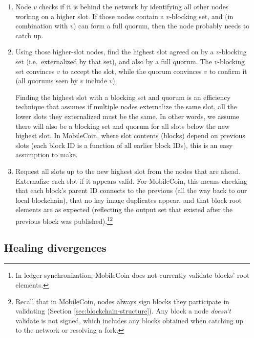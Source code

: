 \begin{enumerate}
    \item Node $v$ checks if it is behind the network by identifying all other nodes working on a higher slot. If those nodes contain a $v$-blocking set, and (in combination with $v$) can form a full quorum, then the node probably needs to catch up.

    \item Using those higher-slot nodes, find the highest slot agreed on by a $v$-blocking set (i.e.\ externalized by that set), and also by a full quorum. The $v$-blocking set convinces $v$ to accept the slot, while the quorum convinces $v$ to confirm it (all quorums seen by $v$ include $v$).

    Finding the highest slot with a blocking set and quorum is an efficiency technique that assumes if multiple nodes externalize the same slot, all the lower slots they externalized must be the same. In other words, we assume there will also be a blocking set and quorum for all slots below the new highest slot. In MobileCoin, where slot contents (blocks) depend on previous slots (each block ID is a function of all earlier block IDs), this is an easy assumption to make.

    \item Request all slots up to the new highest slot from the nodes that are ahead. Externalize each slot if it appears valid. For MobileCoin, this means checking that each block's parent ID connects to the previous (all the way back to our local blockchain), that no key image duplicates appear, and that block root elements are as expected (reflecting the output set that existed after the previous block was published).\footnote{In ledger synchronization, MobileCoin does not currently validate blocks' root elements.}\footnote{Recall that in MobileCoin, nodes always sign blocks they participate in validating (Section \ref{sec:blockchain-structure}). Any block a node {\em doesn't} validate is not signed, which includes any blocks obtained when catching up to the network or resolving a fork.}
\end{enumerate}


\subsection{Healing divergences}
\label{subsec:consensus-healing-divergences}

